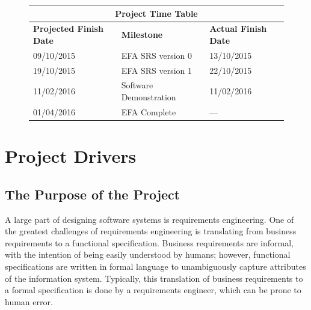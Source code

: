 \documentclass[12pt]{report}
\begin{document}
\newpage

\tableofcontents
\listoffigures
\listoftables

\newpage
{} %

\setlength{\arrayrulewidth}{0.35mm}
\setlength{\tabcolsep}{16pt}
\renewcommand{\arraystretch}{2}
\begin{figure}
	\begin{adjustwidth}{-1cm}{}
	\begin{tabular}{ |m{4cm}|m{6cm}|m{4cm}|  }
		\hline
		\multicolumn{3}{|c|}{\bfseries{Project Time Table}} \\
		\hline
		\bfseries{Projected Finish Date}& \bfseries{Milestone} & 
		\bfseries{Actual Finish Date} \\
		\hline
		 09/10/2015& EFA SRS version 0 & 13/10/2015 \\
		19/10/2015 & EFA SRS version 1  & 22/10/2015 \\
		11/02/2016 & Software Demonstration & 11/02/2016 \\
        01/04/2016 & EFA Complete & --- \\
		\hline
	\end{tabular}
	\end{adjustwidth}
\end{figure}
\chapter{Project Drivers}\label{ch:Intro}
{\section{The Purpose of the Project}\label{sec:Purpose}}
A large part of designing software systems is requirements engineering. One
of the greatest challenges of requirements engineering is translating from
business requirements to a functional specification. Business requirements are
informal, with the intention of being easily understood by humans; however,
functional specifications are written in formal language to unambiguously capture attributes of the 
information system. Typically, this translation
of business requirements to a formal specification is done by a requirements
engineer, which can be prone to human error.
\end{document}
